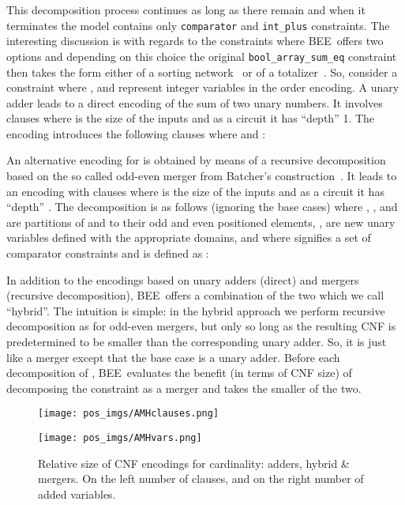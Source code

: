 \documentclass[runningheads,a4paper]{llncs}
\newcommand{\bee}{\textsf{BEE}}
\begin{document}
This decomposition process continues as long as there remain
 and when it terminates the model contains
only \texttt{comparator} and \texttt{int\_plus} constraints.
The interesting discussion is with regards to the 
constraints where \bee\ offers two options and depending on this
choice the original \texttt{bool\_array\_sum\_eq} constraint then
takes the form either of a sorting network~\cite{Batcher68} or of a
totalizer~\cite{BailleuxB03}.
So, consider a  constraint  where
,  and
 represent integer variables in the
order encoding.
A unary adder leads to a direct encoding of the sum of two unary
numbers. It involves   clauses where  is the size of
the inputs and as a circuit it has ``depth'' 1. The encoding introduces
the following clauses where  and :

An alternative encoding for  is obtained by
means of a recursive decomposition based on the so called odd-even
merger from Batcher's construction~\cite{Batcher68}. It leads to an
encoding with  clauses where  is the size of the inputs
and as a circuit it has ``depth'' . The decomposition is as
follows (ignoring the base cases) where ,
,  and  are partitions
of  and  to their odd and even positioned
elements, ,  are new unary variables
defined with the appropriate domains, and where
 signifies a set of comparator
constraints and is defined as :
 
In addition to the encodings based on unary adders (direct) and
mergers (recursive decomposition), \bee\ offers a combination of the
two which we call ``hybrid''.  The intuition is simple: in the hybrid
approach we perform recursive decomposition as for odd-even mergers,
but only so long as the resulting CNF is predetermined to be
smaller than the corresponding unary adder. So, it is just like a
merger except that the base case is a unary adder.
Before each decomposition of , \bee\ evaluates the
benefit (in terms of CNF size) of decomposing the constraint as a
merger and takes the smaller of the two.


\begin{figure}[t]
\begin{minipage}{0.47\linewidth}
  \texttt{[image: pos\_imgs/AMHclauses.png]}
\end{minipage}
\qquad
\begin{minipage}{0.47\linewidth}
\texttt{[image: pos\_imgs/AMHvars.png]}
\end{minipage}
\caption {Relative size of CNF encodings for cardinality: adders,
  hybrid \& mergers. On the left number of clauses, and on the right
  number of added variables.}
 \label{fig:size}
\end{figure}
\end{document}
